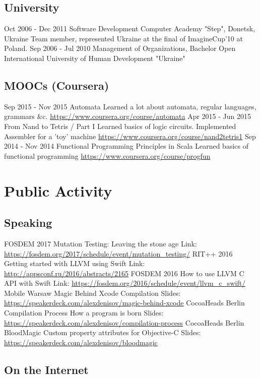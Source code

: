 \documentclass[11pt,a4paper]{moderncv}
\begin{document}
  \subsection{University}
  \cventry
    {Oct 2006 - Dec 2011}
    {Software Development}
    {Computer Academy "Step", Donetsk, Ukraine}
    {}{}
    {Team member, represented Ukraine at the final of ImagineCup'10 at Poland.}
  \cventry
    {Sep 2006 - Jul 2010}
    {Management of Organizations, Bachelor}
    {Open International University of Human Development "Ukraine"}
    {}{}{}
  \subsection{MOOCs (Coursera)}
  \cventry
    {Sep 2015 - Nov 2015}
    {Automata}
    {\newline Learned a lot about automata, regular languages, grammars \&c.}
    {}{\newline\url{https://www.coursera.org/course/automata}}{}
  \cventry
    {Apr 2015 - Jun 2015}
    {From Nand to Tetris / Part I}
    {\newline Learned basics of logic circuits. Implemented Assembler for a 'toy' machine}
    {}{\newline\url{https://www.coursera.org/course/nand2tetris1}}{}
  \cventry
    {Sep 2014 - Nov 2014}
    {Functional Programming Principles in Scala}
    {\newline Learned basics of functional programming}
    {}{\newline\url{https://www.coursera.org/course/progfun}}{}

\section{Public Activity}
  \subsection{Speaking}
  \cventry
    {FOSDEM 2017}
    {Mutation Testing: Leaving the stone age}
    {}
    {}{}
    {Link: \url{https://fosdem.org/2017/schedule/event/mutation_testing/}}
  \cventry
    {RIT++ 2016}
    {Getting started with LLVM using Swift}
    {}
    {}{}
    {Link: \url{http://appsconf.ru/2016/abstracts/2165}}
  \cventry
    {FOSDEM 2016}
    {How to use LLVM C API with Swift}
    {}
    {}{}
    {Link: \url{https://fosdem.org/2016/schedule/event/llvm_c_swift/}}
  \cventry
    {Mobile Warsaw}
    {Magic Behind Xcode}
    {Compilation}
    {}{}
    {Slides: \url{https://speakerdeck.com/alexdenisov/magic-behind-xcode}}
  \cventry
    {CocoaHeads Berlin}
    {Compilation Process}
    {How a program is born}
    {}{}
    {Slides: \url{https://speakerdeck.com/alexdenisov/compilation-process}}
  \cventry
    {CocoaHeads Berlin}
    {BloodMagic}
    {Custom property attributes for Objective-C}
    {}{}
    {Slides: \url{https://speakerdeck.com/alexdenisov/bloodmagic}}
  \subsection{On the Internet}
\end{document}
